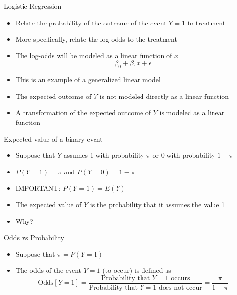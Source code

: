 \documentclass[xcolor=x11names,compress]{beamer}\usepackage[]{graphicx}\usepackage[]{color}
\begin{document}
\begin{frame}{Logistic Regression}
  \begin{itemize}
  \item Relate the probability of the outcome of the event $Y=1$ to treatment
  \item More specifically, relate the log-odds to the treatment
  \item The log-odds will be modeled as a linear function of $x$
    \begin{equation*}
      \beta_0+\beta_1 x + \epsilon
    \end{equation*}
  \item This is an example of a generalized linear model
  \item The expected outcome of $Y$ is not modeled directly as a linear function
  \item A transformation of the expected outcome of $Y$ is modeled as a linear function
  \end{itemize}
\end{frame}


\begin{frame}{Expected value of a binary event}
  \begin{itemize}
  \item Suppose that $Y$ assumes 1 with probability $\pi$ or 0 with probability $1-\pi$
  \item $P(Y=1)=\pi$ and $P(Y=0)=1-\pi$
  \item IMPORTANT: $P(Y=1)=E(Y)$
  \item The expected value of $Y$ is the probability that it assumes the value 1
  \item Why?
  \end{itemize}
\end{frame}


\begin{frame}{Odds vs Probability}
  \begin{itemize}
  \item Suppose that $\pi=P(Y=1)$
  \item The odds of the event $Y=1$ (to occur) is defined as
    \begin{equation*}
      \mathrm{Odds}[Y=1]=
      \frac{\mbox{Probability that $Y=1$ occurs}}{\mbox{Probability that $Y=1$ does not occur}}=
        \frac{\pi}{1-\pi}
    \end{equation*}
  \end{itemize}
\end{frame}
\end{document}
